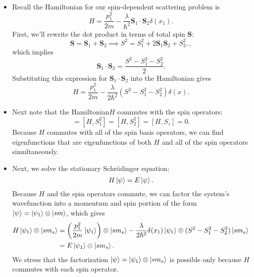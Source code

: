 \documentclass[11pt, a4paper]{article}
\newcommand{\Schro}{Schr\"{o}dinger\xspace}
\newcommand{\Ham}{Hamiltonian\xspace}
\renewcommand{\vec}[1]{\bm{#1}} %
\begin{document}
\begin{itemize}
	\item Recall the Hamiltonian for our spin-dependent scattering problem is
	\begin{equation*}
		H = \frac{p_{1}^{2}}{2m} - \frac{\lambda}{\hbar^{2}}\vec{S}_{1} \cdot \vec{S}_{2}\delta (x_{1}).
	\end{equation*}
	First, we'll rewrite the dot product in terms of total spin $ \vec{S} $:
	\begin{equation*}
		\vec{S} = \vec{S}_{1} + \vec{S}_{2} \implies S^{2} = S_{1}^{2} + 2\vec{S}_{1}\vec{S}_{2} + S_{2}^{2},,
	\end{equation*}
	which implies 
	\begin{equation*}
		\vec{S}_{1}\cdot \vec{S}_{2} = \frac{S^{2} -S_{1}^{2} - S_{2}^{2}}{2}.
	\end{equation*}
	Substituting this expression for $ \vec{S}_{1}\cdot \vec{S}_{2} $ into the Hamiltonian gives
	\begin{equation*}
		H = \frac{p_{1}^{2}}{2m} -  \frac{\lambda}{2\hbar^{2}}(S^{2} -S_{1}^{2} - S_{2}^{2})\delta(x).
	\end{equation*}
	
	\item Next note that the \Ham $ H $ commutes with the spin operators:
	\begin{equation*}
		[H, S^{2}] = [H, S_{1}^{2}] = [H, S_{2}^{2}] = [H, S_{z}] = 0.
	\end{equation*}
	Because $ H $ commutes with all of the spin basis operators, we can find eigenfunctions that are eigenfunctions of both $ H $ and all of the spin operators simultaneously.
	
	\item Next, we solve the stationary \Schro equation:
	\begin{equation*}
		H \ket{\psi} = E\ket{\psi}.
	\end{equation*}
	Because $ H $ and the spin operators commute, we can factor the system's wavefunction into a momentum and spin portion of the form $ \ket{\psi} = \ket{\psi_{1}} \otimes \ket{sm} $, which gives
	\begin{align*}
		H \ket{\psi_{1}} \otimes \ket{sm_{s}} &= \left(\frac{p_{1}^{2}}{2m}\ket{\psi_{1}}\right)\otimes \ket{sm_{s}} - \frac{\lambda}{2\hbar^{2}} \delta (x_{1})\ket{\psi_{1}}\otimes (S^{2} -S_{1}^{2} - S_{2}^{2}) \ket{sm_{s}}\\
		&= E \ket{\psi_{1}}\otimes \ket{sm_{s}}.
	\end{align*}
	We stress that the factorization $ \ket{\psi} = \ket{\psi_{1}} \otimes \ket{sm_{s}} $ is possible only because $ H $ commutes with each spin operator.
	

\end{itemize}
\end{document}
